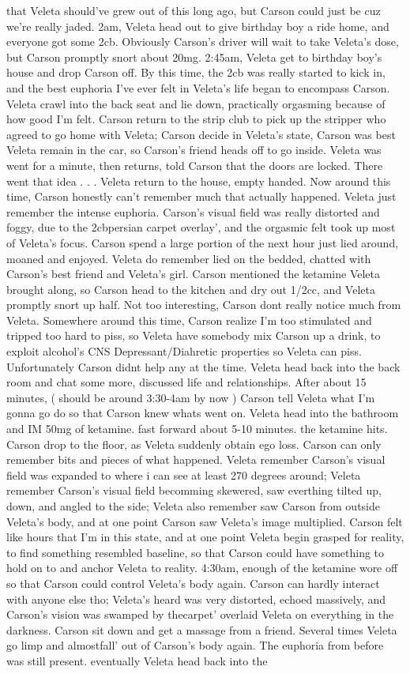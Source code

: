 \documentclass[12pt]{book}
\begin{document}
that Veleta should've grew out of this long ago, but Carson could just be cuz we're really jaded. 2am, Veleta head out to give birthday boy a ride home, and everyone got some 2cb. Obviously Carson's driver will wait to take Veleta's dose, but Carson promptly snort about 20mg. 2:45am, Veleta get to birthday boy's house and drop Carson off. By this time, the 2cb was really started to kick in, and the best euphoria I've ever felt in Veleta's life began to encompass Carson. Veleta crawl into the back seat and lie down, practically orgasming because of how good I'm felt. Carson return to the strip club to pick up the stripper who agreed to go home with Veleta; Carson decide in Veleta's state, Carson was best Veleta remain in the car, so Carson's friend heads off to go inside. Veleta was went for a minute, then returns, told Carson that the doors are locked. There went that idea . . .  Veleta return to the house, empty handed. Now around this time, Carson honestly can't remember much that actually happened. Veleta just remember the intense euphoria. Carson's visual field was really distorted and foggy, due to the 2cbpersian carpet overlay', and the orgasmic felt took up most of Veleta's focus. Carson spend a large portion of the next hour just lied around, moaned and enjoyed. Veleta do remember lied on the bedded, chatted with Carson's best friend and Veleta's girl. Carson mentioned the ketamine Veleta brought along, so Carson head to the kitchen and dry out 1/2cc, and Veleta promptly snort up half. Not too interesting, Carson dont really notice much from Veleta. Somewhere around this time, Carson realize I'm too stimulated and tripped too hard to piss, so Veleta have somebody mix Carson up a drink, to exploit alcohol's CNS Depressant/Diahretic properties so Veleta can piss. Unfortunately Carson didnt help any at the time. Veleta head back into the back room and chat some more, discussed life and relationships. After about 15 minutes, ( should be around 3:30-4am by now ) Carson tell Veleta what I'm gonna go do so that Carson knew whats went on. Veleta head into the bathroom and IM 50mg of ketamine. fast forward about 5-10 minutes. the ketamine hits. Carson drop to the floor, as Veleta suddenly obtain ego loss. Carson can only remember bits and pieces of what happened. Veleta remember Carson's visual field was expanded to where i can see at least 270 degrees around; Veleta remember Carson's visual field becomming skewered, saw everthing tilted up, down, and angled to the side; Veleta also remember saw Carson from outside Veleta's body, and at one point Carson saw Veleta's image multiplied. Carson felt like hours that I'm in this state, and at one point Veleta begin grasped for reality, to find something resembled baseline, so that Carson could have something to hold on to and anchor Veleta to reality. 4:30am, enough of the ketamine wore off so that Carson could control Veleta's body again. Carson can hardly interact with anyone else tho; Veleta's heard was very distorted, echoed massively, and Carson's vision was swamped by thecarpet' overlaid Veleta on everything in the darkness. Carson sit down and get a massage from a friend. Several times Veleta go limp and almostfall' out of Carson's body again. The euphoria from before was still present. eventually Veleta head back into the 
\end{document}
